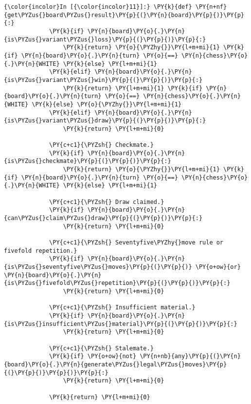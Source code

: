     \begin{Verbatim}[commandchars=\\\{\}]
{\color{incolor}In [{\color{incolor}11}]:} \PY{k}{def} \PY{n+nf}{get\PYZus{}board\PYZus{}result}\PY{p}{(}\PY{n}{board}\PY{p}{)}\PY{p}{:}
             \PY{k}{if} \PY{n}{board}\PY{o}{.}\PY{n}{is\PYZus{}variant\PYZus{}loss}\PY{p}{(}\PY{p}{)}\PY{p}{:}
                 \PY{k}{return} \PY{o}{\PYZhy{}}\PY{l+m+mi}{1} \PY{k}{if} \PY{n}{board}\PY{o}{.}\PY{n}{turn} \PY{o}{==} \PY{n}{chess}\PY{o}{.}\PY{n}{WHITE} \PY{k}{else} \PY{l+m+mi}{1}
             \PY{k}{elif} \PY{n}{board}\PY{o}{.}\PY{n}{is\PYZus{}variant\PYZus{}win}\PY{p}{(}\PY{p}{)}\PY{p}{:}
                 \PY{k}{return} \PY{l+m+mi}{1} \PY{k}{if} \PY{n}{board}\PY{o}{.}\PY{n}{turn} \PY{o}{==} \PY{n}{chess}\PY{o}{.}\PY{n}{WHITE} \PY{k}{else} \PY{o}{\PYZhy{}}\PY{l+m+mi}{1}
             \PY{k}{elif} \PY{n}{board}\PY{o}{.}\PY{n}{is\PYZus{}variant\PYZus{}draw}\PY{p}{(}\PY{p}{)}\PY{p}{:}
                 \PY{k}{return} \PY{l+m+mi}{0}
         
             \PY{c+c1}{\PYZsh{} Checkmate.}
             \PY{k}{if} \PY{n}{board}\PY{o}{.}\PY{n}{is\PYZus{}checkmate}\PY{p}{(}\PY{p}{)}\PY{p}{:}
                 \PY{k}{return} \PY{o}{\PYZhy{}}\PY{l+m+mi}{1} \PY{k}{if} \PY{n}{board}\PY{o}{.}\PY{n}{turn} \PY{o}{==} \PY{n}{chess}\PY{o}{.}\PY{n}{WHITE} \PY{k}{else} \PY{l+m+mi}{1}
         
             \PY{c+c1}{\PYZsh{} Draw claimed.}
             \PY{k}{if} \PY{n}{board}\PY{o}{.}\PY{n}{can\PYZus{}claim\PYZus{}draw}\PY{p}{(}\PY{p}{)}\PY{p}{:}
                 \PY{k}{return} \PY{l+m+mi}{0}
         
             \PY{c+c1}{\PYZsh{} Seventyfive\PYZhy{}move rule or fivefold repetition.}
             \PY{k}{if} \PY{n}{board}\PY{o}{.}\PY{n}{is\PYZus{}seventyfive\PYZus{}moves}\PY{p}{(}\PY{p}{)} \PY{o+ow}{or} \PY{n}{board}\PY{o}{.}\PY{n}{is\PYZus{}fivefold\PYZus{}repetition}\PY{p}{(}\PY{p}{)}\PY{p}{:}
                 \PY{k}{return} \PY{l+m+mi}{0}
         
             \PY{c+c1}{\PYZsh{} Insufficient material.}
             \PY{k}{if} \PY{n}{board}\PY{o}{.}\PY{n}{is\PYZus{}insufficient\PYZus{}material}\PY{p}{(}\PY{p}{)}\PY{p}{:}
                 \PY{k}{return} \PY{l+m+mi}{0}
         
             \PY{c+c1}{\PYZsh{} Stalemate.}
             \PY{k}{if} \PY{o+ow}{not} \PY{n+nb}{any}\PY{p}{(}\PY{n}{board}\PY{o}{.}\PY{n}{generate\PYZus{}legal\PYZus{}moves}\PY{p}{(}\PY{p}{)}\PY{p}{)}\PY{p}{:}
                 \PY{k}{return} \PY{l+m+mi}{0}
             
             \PY{k}{return} \PY{l+m+mi}{0}
\end{Verbatim}

